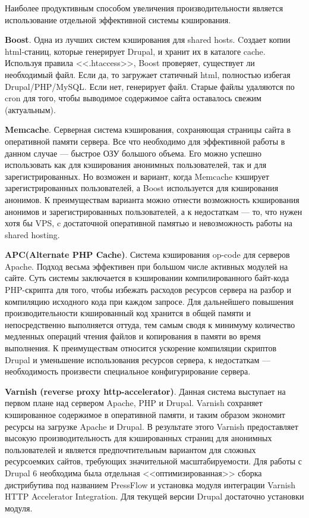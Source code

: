 \documentclass[10pt, a5paper]{article}
\begin{document}
Наиболее продуктивным способом увеличения производительности является использование отдельной  эффективной системы кэширования.

{\bf Boost}. Одна из лучших систем кэширования для shared hosts. Cоздает копии html-станиц, которые генерирует Drupal, и хранит их в каталоге cache. Используя правила <<.htaccess>>, Boost проверяет, существует ли необходимый файл. Если да, то загружает статичный html, полностью избегая Drupal/PHP/MySQL. Если нет,  генерирует файл. Старые файлы удаляются по cron для того, чтобы выводимое содержимое сайта оставалось свежим (актуальным).

{\bf Memcache}. Серверная система кэширования, сохраняющая \linebreak страницы сайта в оперативной памяти сервера. Все что необходимо для эффективной работы в данном случае --- быстрое ОЗУ большого объема. Его можно успешно использовать как для кэширования анонимных пользователей, так и для зарегистрированных. Но возможен и вариант, когда Memcache кэширует зарегистрированных пользователей, а Boost используется для кэширования анонимов. К преимуществам варианта можно отнести возможность кэширования анонимов и зарегистрированных пользователей, а к недостаткам --- то, что нужен хотя бы VPS, c достаточной оперативной памятью и невозможность работы на shared hosting.

{\bf APC(Alternate PHP Cache)}. Система кэширования op-code для серверов Apache. Подход весьма эффективен при большом числе активных модулей на сайте. Суть системы заключается в кэшировании компилированного байт-кода PHP-скрипта для того, чтобы избежать расходов ресурсов сервера на разбор и компиляцию исходного кода при каждом запросе. Для дальнейшего повышения производительности кэшированный код хранится в общей памяти и непосредственно выполняется оттуда, тем самым сводя к минимуму количество медленных операций чтения файлов и копирования в памяти во время выполнения.
К преимуществам относится ускорение компиляции скриптов Drupal и уменьшение использования ресурсов сервера, к недостаткам --- необходимость произвести специальное конфигурирование сервера.

{\bf Varnish (reverse proxy http-accelerator)}. Данная система выступает на первом плане над сервером Apache, PHP и Drupal. \linebreak Varnish сохраняет кэшированное содержимое в оперативной памяти, и таким образом экономит ресурсы на загрузке Apache и Drupal. В результате этого Varnish предоставляет высокую производительность для кэшированных страниц для анонимных пользователей и является предпочтительным вариантом для сложных ресурсоемких сайтов, требующих значительной  масштабируемости. Для работы с Drupal 6 необходима была отдельная <<оптимизированная>> сборка дистрибутива под названием PressFlow и установка модуля интеграции Varnish HTTP Accelerator Integration. Для текущей версии Drupal достаточно установки модуля.
\end{document}
